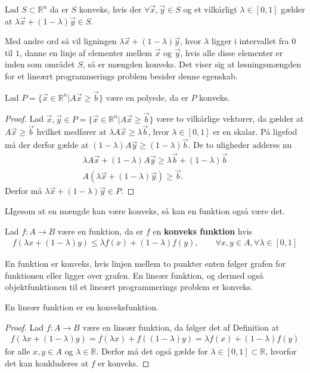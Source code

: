 \begin{defn} 
Lad $S \subset \mathds{R}^n$  da er $S$ konveks, hvis der $\forall \vec{x}, \vec{y} \in S$ og et vilkårligt $\lambda \in [0,1]$ gælder at $\lambda \vec{x} + (1-\lambda) \vec{y} \in S$.
\label{def:Konveks}
\end{defn}
Med andre ord så vil ligningen $\lambda \vec{x} + (1-\lambda) \vec{y}$, hvor $\lambda$ ligger i intervallet fra $0$ til $1$, danne en linje af elementer mellem $\vec{x}$ og $\vec{y}$, hvis alle disse elementer er inden som området $S$, så er mængden konveks.
Det viser sig at løsningsmængden for et lineært programmerings problem besider denne egenskab.
\begin{stn}
Lad $P =\{ \vec{x} \in \mathds{R}^n | A \vec{x} \geq \vec{b}\} $ være en polyede, da er $P$ konveks.
\label{stn:polykon}
\end{stn}
\begin{proof}
Lad $\vec{x}, \vec{y} \in P=\{ \vec{x} \in \mathds{R}^n | A \vec{x} \geq \vec{b}\}$ være to vilkårlige vektorer, da gælder at $A\vec{x} \geq \vec{b}$ hvilket medfører at $\lambda A \vec{x} \geq \lambda\vec{b}$, hvor $\lambda \in [0,1]$ er en skalar. 
På ligefod må der derfor gælde at $(1-\lambda)A\vec{y} \geq (1-\lambda)\vec{b}$.
De to uligheder adderes nu
\begin{align*}
\lambda A \vec{x} + (1-\lambda) A \vec{y} \geq \lambda \vec{b} + (1 - \lambda) \vec{b}
\\  A (\lambda\vec{x} + (1-\lambda)\vec{y}) \geq \vec{b}.
\end{align*}
Derfor må $\lambda\vec{x} + (1-\lambda)\vec{y} \in P$.
\end{proof}
LIgesom at en mængde kan være konveks, så kan en funktion også være det.
\begin{defn}
Lad $f:A\to B$ være en funktion, da er $f$ en \textbf{konveks funktion} hvis
\begin{align*}
	f(\lambda x + (1-\lambda) y) \leq \lambda f(x) + (1-\lambda)f(y), \qquad \forall x,y \in A, \forall \lambda \in [0,1]
\end{align*}
\end{defn}
En funktion er konveks, hvis linjen mellem to punkter enten følger grafen for funktionen eller ligger over grafen. 
En lineær funktion, og dermed også objektfunktionen til et lineært programmerings problem er konveks.
\begin{stn}
En lineær funktion er en konveksfunktion.
\label{stn:funkon}
\end{stn}
\begin{proof}
Lad $f:A\to B$ være en lineær funktion, da følger det af Definition
at 
\begin{align*}
f(\lambda x + (1-\lambda) y)  = f(\lambda x) + f((1-\lambda)y)  = \lambda f(x) + (1-\lambda)f(y)
\end{align*}
for alle $x,y \in A$ og $\lambda \in \mathds{R}$. 
Derfor må det også gælde for $\lambda \in [0,1] \subset \mathds{R}$, hvorfor det kan konkluderes at $f$ er konveks.
\end{proof}
